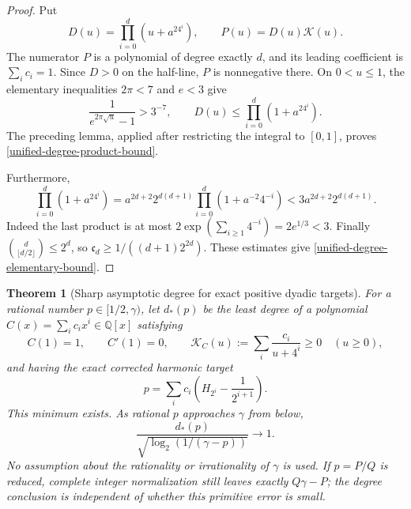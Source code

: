 \documentclass[11pt,a4paper]{article}
\newtheorem{theorem}{Theorem}[section]
\theoremstyle{definition}
\theoremstyle{remark}
\begin{document}
\begin{proof}
Put
\[
 D(u)=\prod_{i=0}^d(u+a^24^i),\qquad P(u)=D(u)\mathcal K(u).
\]
The numerator $P$ is a polynomial of degree exactly $d$, and its leading
coefficient is $\sum_i c_i=1$.  Since $D>0$ on the half-line, $P$ is
nonnegative there.  On $0<u\le1$, the elementary inequalities
$2\pi<7$ and $e<3$ give
\[
 \frac{1}{e^{2\pi\sqrt u}-1}>3^{-7},\qquad
 D(u)\le\prod_{i=0}^d(1+a^24^i).
\]
The preceding lemma, applied after restricting the integral to $[0,1]$,
proves \eqref{unified-degree-product-bound}.

Furthermore,
\[
 \prod_{i=0}^d(1+a^24^i)
 =a^{2d+2}2^{d(d+1)}
       \prod_{i=0}^d(1+a^{-2}4^{-i})
 <3a^{2d+2}2^{d(d+1)}.
\]
Indeed the last product is at most
$2\exp(\sum_{i\ge1}4^{-i})=2e^{1/3}<3$.
Finally $\binom d{\lfloor d/2\rfloor}\le2^d$, so
$\mathfrak c_d\ge1/((d+1)2^{2d})$.  These estimates give
\eqref{unified-degree-elementary-bound}.
\end{proof}

\begin{theorem}[Sharp asymptotic degree for exact positive dyadic targets]
\label{unified-degree-sharp}
For a rational number $p\in[1/2,\gamma)$, let $d_*(p)$ be the least
degree of a polynomial $C(x)=\sum_i c_i x^i\in\mathbb Q[x]$ satisfying
\[
 C(1)=1,\qquad C'(1)=0,\qquad
 \mathcal K_C(u):=\sum_i\frac{c_i}{u+4^i}\ge0\quad(u\ge0),
\]
and having the exact corrected harmonic target
\[
 p=\sum_i c_i\left(H_{2^i}-\frac1{2^{i+1}}\right).
\]
This minimum exists.  As rational $p$ approaches $\gamma$ from below,
\begin{equation}
 \frac{d_*(p)}{\sqrt{\log_2(1/(\gamma-p))}}\longrightarrow1.
 \label{unified-degree-sharp-limit}
\end{equation}
No assumption about the rationality or irrationality of $\gamma$ is
used.  If $p=P/Q$ is reduced, complete integer normalization still
leaves exactly $Q\gamma-P$; the degree conclusion is independent of
whether this primitive error is small.
\end{theorem}
\end{document}
